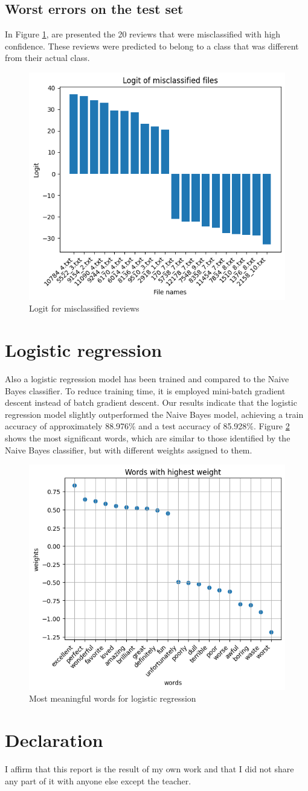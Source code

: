\documentclass[eng]{class}
\begin{document}
\subsection{Worst errors on the test set}
In Figure \ref{fig-3}, are presented the 20 reviews that were misclassified with high confidence.
These reviews were predicted to belong to a class that was different from their actual class.
\begin{figure}[h]
  \centering
  \includegraphics[width=.5\columnwidth]{images/missclassified.png}
  \caption{Logit for misclassified reviews}
  \label{fig-3}
\end{figure}

\section{Logistic regression}
Also a logistic regression model has been trained and compared to the Naive Bayes classifier. To reduce training time, it is employed mini-batch gradient descent instead of batch gradient descent.
Our results indicate that the logistic regression model slightly outperformed the Naive Bayes model, achieving a train accuracy of approximately 88.976\% and a test accuracy of 85.928\%.
Figure \ref{fig-4} shows the most significant words, which are similar to those identified by the Naive Bayes classifier, but with different weights assigned to them.
\begin{figure}[h]
  \centering
  \includegraphics[width=.5\columnwidth]{images/lrwords.png}
  \caption{Most meaningful words for logistic regression}
  \label{fig-4}
\end{figure}

\section{Declaration}
I affirm that this report is the result of my own work and that I did not share any part of it with anyone
else except the teacher.
\end{document}
